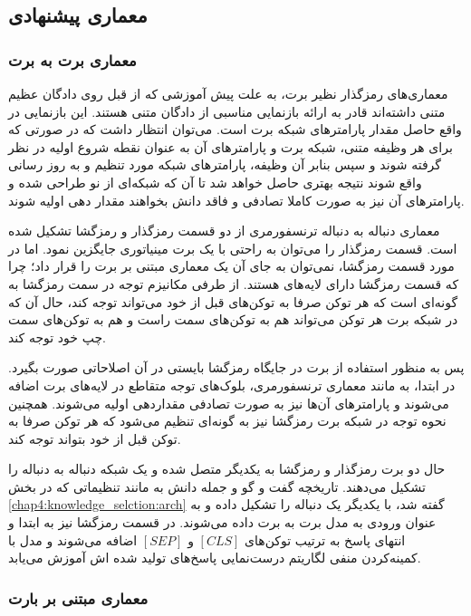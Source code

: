 \subsection{معماری پیشنهادی}

\subsubsection{معماری برت به برت} \label{chap4:generation:bert2bert}

معماری‌های رمزگذار نظیر برت، به علت پیش آموزشی که از قبل روی دادگان عظیم متنی داشته‌اند قادر به ارائه بازنمایی مناسبی از دادگان متنی هستند. این بازنمایی در واقع حاصل مقدار پارامتر‌های شبکه برت است. می‌توان انتظار داشت که در صورتی که برای هر وظیفه متنی،‌ شبکه برت و پارامتر‌های آن به عنوان نقطه شروع اولیه در نظر گرفته شوند و سپس بنابر آن وظیفه، پارامتر‌های شبکه مورد تنظیم و به روز رسانی واقع شوند نتیجه بهتری حاصل خواهد شد تا آن که شبکه‌ای از نو طراحی شده و پارامتر‌های آن نیز به صورت کاملا تصادفی و فاقد دانش بخواهند مقدار دهی اولیه شوند. 

معماری دنباله به دنباله ترنسفورمری از دو قسمت رمزگذار و رمزگشا تشکیل شده است. قسمت رمزگذار را می‌توان به راحتی با یک برت مینیاتوری جایگزین نمود. اما در مورد قسمت رمزگشا، نمی‌توان به جای آن  یک معماری مبتنی بر برت را قرار داد؛ چرا که قسمت رمزگشا دارای لایه‌های 
هستند. از طرفی مکانیزم توجه در سمت رمزگشا به گونه‌ای است که هر توکن صرفا به توکن‌های قبل از خود می‌تواند توجه کند، حال آن که در شبکه برت هر توکن می‌تواند هم به توکن‌های سمت راست و هم به توکن‌های سمت چپ خود توجه کند. 

پس به منظور استفاده از برت در جایگاه رمزگشا بایستی در آن اصلاحاتی صورت بگیرد. در ابتدا، به مانند معماری ترنسفورمری،‌ بلوک‌های توجه متقاطع در لایه‌های برت اضافه می‌شوند و پارامتر‌های آن‌ها نیز به صورت تصادفی مقداردهی اولیه می‌شوند. همچنین نحوه توجه در شبکه برت رمزگشا نیز به گونه‌ای تنظیم می‌شود که هر توکن صرفا به توکن قبل از خود بتواند توجه کند.

حال دو برت رمزگذار و رمزگشا به یکدیگر متصل شده و یک شبکه دنباله به دنباله را تشکیل می‌دهند. تاریخچه گفت و گو و جمله دانش به مانند تنظیماتی که در 
بخش 
\ref{chap4:knowledge_selction:arch}
گفته شد، با یکدیگر یک دنباله را تشکیل داده و به عنوان ورودی به مدل برت به برت داده می‌شوند. در قسمت رمزگشا نیز به ابتدا و انتهای پاسخ به ترتیب توکن‌های
$[CLS]$
و
$[SEP]$
اضافه می‌شوند و مدل با کمینه‌کردن منفی لگاریتم درست‌نمایی پاسخ‌های تولید شده اش  آموزش می‌یابد.  

\subsubsection{معماری مبتنی بر بارت} \label{chap4:generation:bart}

